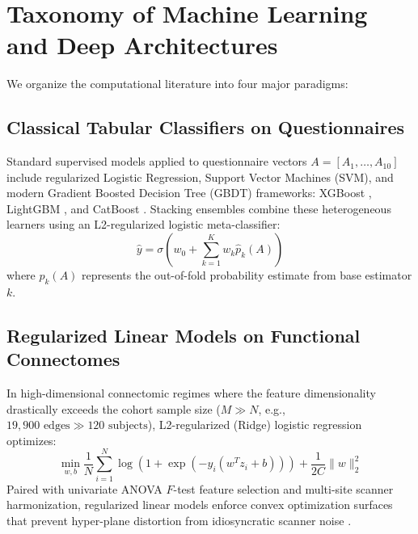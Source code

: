\documentclass[journal]{IEEEtran}
\begin{document}
\section{Taxonomy of Machine Learning and Deep Architectures}
We organize the computational literature into four major paradigms:

\subsection{Classical Tabular Classifiers on Questionnaires}
Standard supervised models applied to questionnaire vectors $A = [A_1, \dots, A_{10}]$ include regularized Logistic Regression, Support Vector Machines (SVM), and modern Gradient Boosted Decision Tree (GBDT) frameworks: XGBoost \cite{chen2016xgboost}, LightGBM \cite{ke2017lightgbm}, and CatBoost \cite{prokhorenkova2018catboost}. Stacking ensembles combine these heterogeneous learners using an L2-regularized logistic meta-classifier:
\begin{equation}
\hat{y} = \sigma\left(w_0 + \sum_{k=1}^K w_k \hat{p}_k(A)\right)
\end{equation}
where $\hat{p}_k(A)$ represents the out-of-fold probability estimate from base estimator $k$.

\subsection{Regularized Linear Models on Functional Connectomes}
In high-dimensional connectomic regimes where the feature dimensionality drastically exceeds the cohort sample size ($M \gg N$, e.g., $19,900 \text{ edges} \gg 120 \text{ subjects}$), L2-regularized (Ridge) logistic regression optimizes:
\begin{equation}
\min_{w, b} \frac{1}{N} \sum_{i=1}^N \log\left(1 + \exp\left(-y_i (w^T z_i + b)\right)\right) + \frac{1}{2C} \|w\|_2^2
\end{equation}
Paired with univariate ANOVA $F$-test feature selection and multi-site scanner harmonization, regularized linear models enforce convex optimization surfaces that prevent hyper-plane distortion from idiosyncratic scanner noise \cite{power2014methods}.
\end{document}
